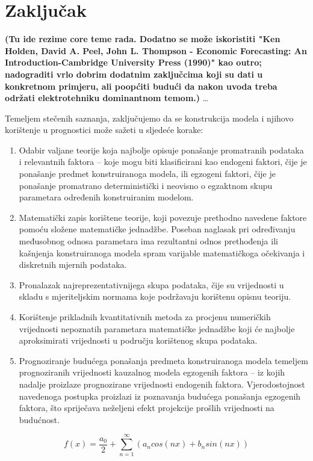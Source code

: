 \documentclass[a4paper,12pt,oneside]{memoir}
\newcommand{\fourierovred}{f(x)= \frac{a_0}{2}+\sum_{n=1}^\infty (a_n cos(nx)+b_n sin(nx))}
\begin{document}
    \chapter{Zaključak}
        \textbf{(Tu ide rezime core teme rada. Dodatno se može iskoristiti "Ken Holden, David A. Peel, John L. Thompson - Economic Forecasting: An Introduction-Cambridge University Press (1990)" kao outro; nadograditi vrlo dobrim dodatnim zaključcima koji su dati u konkretnom primjeru, ali poopćiti budući da nakon uvoda treba održati elektrotehniku dominantnom temom.)} %
        \ldots{}


        Temeljem stečenih saznanja, zaključujemo da se konstrukcija modela i njihovo korištenje u prognostici može sažeti u sljedeće korake:
        \begin{enumerate}
            \item Odabir valjane teorije koja najbolje opisuje ponašanje promatranih podataka i relevantnih faktora -- koje mogu biti klasificirani kao endogeni faktori, čije je ponašanje predmet konstruiranoga modela, ili egzogeni faktori, čije je ponašanje promatrano deterministički i neovisno o egzaktnom skupu parametara određenih konstruiranim modelom.
            \item Matematički zapis korištene teorije, koji povezuje prethodno navedene faktore pomoću složene matematičke jednadžbe. Poseban naglasak pri određivanju međusobnog odnosa parametara ima rezultantni odnos prethođenja ili kašnjenja konstruiranoga modela spram varijable matematičkoga očekivanja i diskretnih mjernih podataka.
            \item Pronalazak najreprezentativnijega skupa podataka, čije su vrijednosti u skladu s mjeriteljskim normama koje podržavaju korištenu opisnu teoriju.
            \item Korištenje prikladnih kvantitativnih metoda za procjenu numeričkih vrijednosti nepoznatih parametara matematičke jednadžbe koji će najbolje aproksimirati vrijednosti u području korištenog skupa podataka.
            \item Prognoziranje budućega ponašanja predmeta konstruiranoga modela temeljem prognoziranih vrijednosti kauzalnog modela egzogenih faktora -- iz kojih nadalje proizlaze prognozirane vrijednosti endogenih faktora. Vjerodostojnost navedenoga postupka proizlazi iz poznavanja budućega ponašanja egzogenih faktora, što spriječava neželjeni efekt projekcije prošlih vrijednosti na budućnost.
        \end{enumerate}
        $$\fourierovred$$
\end{document}
